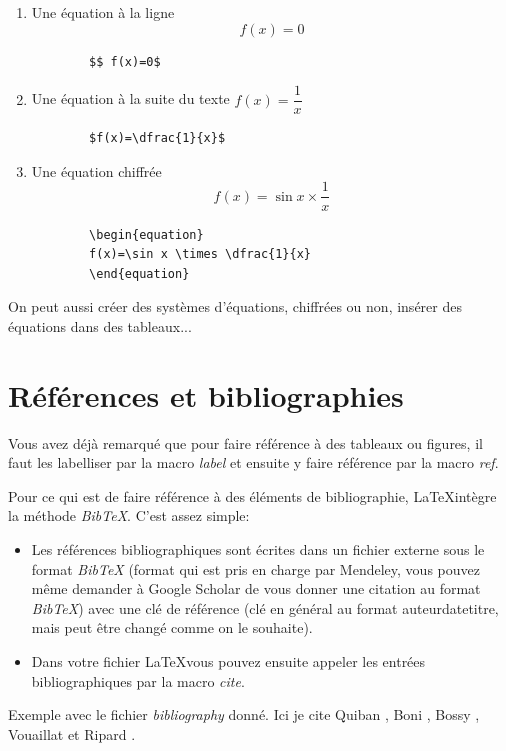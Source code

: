 \documentclass[11pt,a4paper]{article}
\begin{document}
\begin{enumerate}
	\item Une équation à la ligne $$f(x)=0$$
		\begin{verbatim}
		$$ f(x)=0$
		\end{verbatim}
	\item Une équation à la suite du texte $f(x)=\dfrac{1}{x}$
		\begin{verbatim}
		$f(x)=\dfrac{1}{x}$
		\end{verbatim}
	\item Une équation chiffrée
		\begin{equation}
		f(x)=\sin x \times \dfrac{1}{x}
		\end{equation}
		
		\begin{verbatim}
		\begin{equation}
		f(x)=\sin x \times \dfrac{1}{x}
		\end{equation}
		\end{verbatim}
\end{enumerate}

On peut aussi créer des systèmes d'équations, chiffrées ou non, insérer des équations dans des tableaux...

\section{Références et bibliographies}
Vous avez déjà remarqué que pour faire référence à des tableaux ou figures, il faut les labelliser par la macro \textit{label} et ensuite y faire référence par la macro \textit{ref}.

Pour ce qui est de faire référence à des éléments de bibliographie, \LaTeX intègre la méthode \textit{BibTeX}. C'est assez simple:
\begin{itemize}
	\item Les références bibliographiques sont écrites dans un fichier externe sous le format \textit{BibTeX} (format qui est pris en charge par Mendeley, vous pouvez même demander à Google Scholar de vous donner une citation au format \textit{BibTeX}) avec une clé de référence (clé en général au format auteurdatetitre, mais peut être changé comme on le souhaite).
	\item Dans votre fichier \LaTeX vous pouvez ensuite appeler les entrées bibliographiques par la macro \textit{cite}.
\end{itemize}

Exemple avec le fichier \textit{bibliography} donné. Ici je cite Quiban \cite{quiban2020churning}, Boni \cite{boni2017experimental}, Bossy \cite{bossy2019competition}, Vouaillat \cite{vouaillat2019hertzian} et Ripard \cite{ripard2019experimental}.

\end{document}
